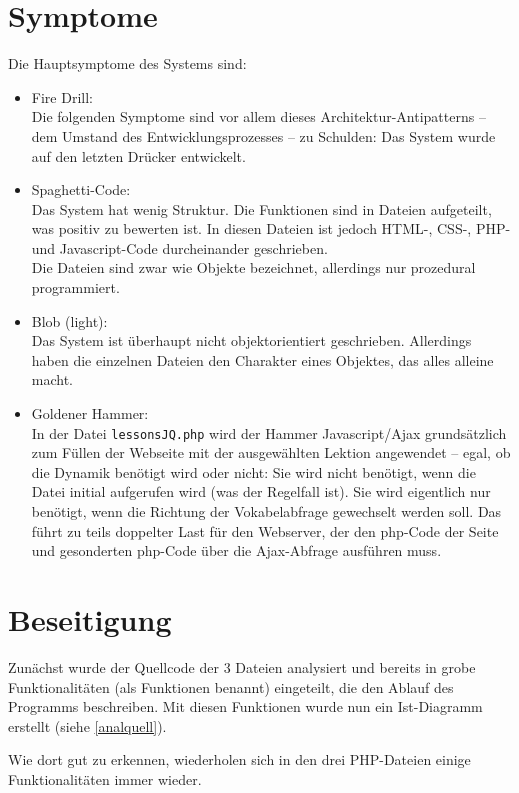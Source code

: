 \documentclass{scrartcl}
\begin{document}
\section{Symptome}
Die Hauptsymptome des Systems sind:
\begin{itemize}
\item Fire Drill:\\
Die folgenden Symptome sind vor allem dieses Architektur-Antipatterns -- dem Umstand des Entwicklungsprozesses -- zu Schulden: Das System wurde auf den letzten Drücker entwickelt. 
\item Spaghetti-Code:\\
Das System hat wenig Struktur. Die Funktionen sind in Dateien aufgeteilt, was positiv zu bewerten ist. In diesen Dateien ist jedoch HTML-, CSS-, PHP- und Javascript-Code durcheinander geschrieben.\\
Die Dateien sind zwar wie Objekte bezeichnet, allerdings nur prozedural programmiert.
\item Blob (light):\\
Das System ist überhaupt nicht objektorientiert geschrieben. Allerdings haben die einzelnen Dateien den Charakter eines Objektes, das alles alleine macht.
\item Goldener Hammer:\\
In der Datei \lstinline`lessonsJQ.php` wird der Hammer Javascript/Ajax grundsätzlich zum Füllen der Webseite mit der ausgewählten Lektion angewendet -- egal, ob die Dynamik benötigt wird oder nicht: Sie wird nicht benötigt, wenn die Datei initial aufgerufen wird (was der Regelfall ist). Sie wird eigentlich nur benötigt, wenn die Richtung der Vokabelabfrage gewechselt werden soll. Das führt zu teils doppelter Last für den Webserver, der den php-Code der Seite und gesonderten php-Code über die Ajax-Abfrage ausführen muss.
\end{itemize}


\section{Beseitigung}

Zunächst wurde der Quellcode der 3 Dateien analysiert und bereits in grobe Funktionalitäten (als Funktionen benannt) eingeteilt, die den Ablauf des Programms beschreiben. Mit diesen Funktionen wurde nun ein Ist-Diagramm erstellt (siehe \autoref{analquell}).

Wie dort gut zu erkennen, wiederholen sich in den drei PHP-Dateien einige Funktionalitäten immer wieder. 
\end{document}
